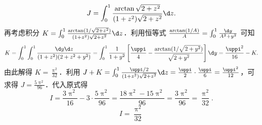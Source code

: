 \begin{solution}
\begin{equation}
        J = \int_0^1 \frac{\arctan \sqrt{2+z^2}}{(1+z^2)\sqrt{2+z^2}} \d z.
    \end{equation}
    再考虑积分 $K = \int_0^1 \frac{\arctan (1/\sqrt{2+z^2})}{(1+z^2)\sqrt{2+z^2}} \d z$．利用恒等式 $\frac{\arctan (1/A)}{A} = \int_0^1 \frac{\d y}{A^2 + y^2}$ 可知
    \begin{equation}
        K = \int_0^1 \int_0^1 \frac{\d y \d z}{(1+z^2)(2+z^2+y^2)} = \int_0^1 \frac{1}{1+y^2} \left[ \frac{\uppi}{4} - \frac{\arctan (1/\sqrt{2+y^2})}{\sqrt{2+y^2}} \right] \d y = \frac{\uppi^2}{16} - K.
    \end{equation}
    由此解得 $K = \frac{\uppi^2}{32}$．利用 $J + K = \int_0^1 \frac{\uppi/2}{(1+z^2)\sqrt{2+z^2}} \d z = \frac{\uppi}{2} \cdot \frac{\uppi}{6} = \frac{\uppi^2}{12}$，可求得 $J = \frac{5\uppi^2}{96}$．代入原式得
    \begin{equation}
        I = \frac{3 \uppi^2}{16} - 3 \cdot \frac{5\uppi^2}{96} = \frac{18\uppi^2 - 15\uppi^2}{96} = \frac{3\uppi^2}{96} = \frac{\uppi^2}{32}.
    \end{equation}
    \begin{equation}
        \boxed{I = \frac{\uppi^2}{32}}
    \end{equation}
\end{solution}

